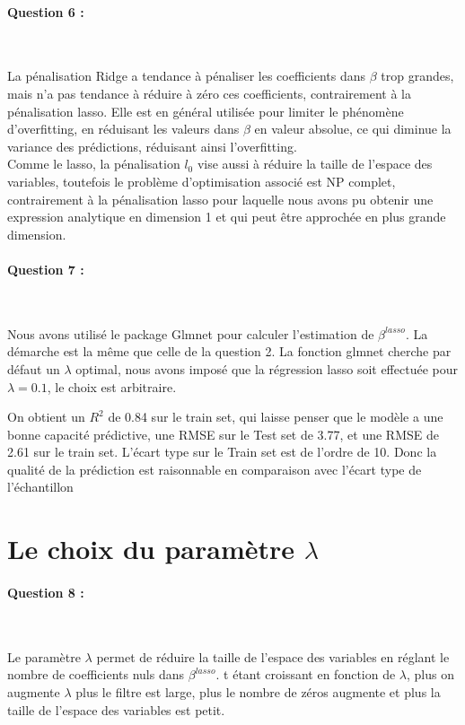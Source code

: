 \documentclass{article}
\begin{document}
	\paragraph{Question 6 :}
	~\par
	
	La pénalisation Ridge a tendance à pénaliser les coefficients dans $\beta$ trop grandes, mais n'a pas tendance à réduire à zéro ces coefficients, contrairement à la pénalisation lasso. Elle est en général utilisée pour limiter le phénomène d'overfitting, en réduisant les valeurs dans $\beta$ en valeur absolue, ce qui diminue la variance des prédictions, réduisant ainsi l'overfitting.
	\\Comme le lasso, la pénalisation $l_{0}$ vise aussi à réduire la taille de l'espace des variables, toutefois le problème d'optimisation associé est NP complet, contrairement à la pénalisation lasso pour laquelle nous avons pu obtenir une expression analytique en dimension 1 et qui peut être approchée en plus grande dimension.

	\paragraph{Question 7 :}
	~\par
	
	Nous avons utilisé le package Glmnet pour calculer l'estimation de $\beta^{lasso}$. La démarche est la même que celle de la question 2. La fonction glmnet cherche par défaut un $\lambda$ optimal, nous avons imposé que la régression lasso soit effectuée pour $\lambda=0.1$, le choix est arbitraire.
	
	On obtient un $R^{2}$ de 0.84 sur le train set, qui laisse penser que le modèle a une bonne capacité prédictive, une RMSE sur le Test set de 3.77, et une RMSE de 2.61 sur le train set. L'écart type sur le Train set est de l'ordre de 10. Donc la qualité de la prédiction est raisonnable en comparaison avec l'écart type de l'échantillon 
	
	
	\section{Le choix du paramètre $\lambda$}
	
	\paragraph{Question 8 :}
	~\par
	
	Le paramètre $\lambda$ permet de réduire la taille de l'espace des variables en réglant le nombre de coefficients nuls dans $\beta^{lasso}$. t étant croissant en fonction de $\lambda$, plus on augmente $\lambda$ plus le filtre est large, plus le nombre de zéros augmente et plus la taille de l'espace des variables est petit.
	
\end{document}
